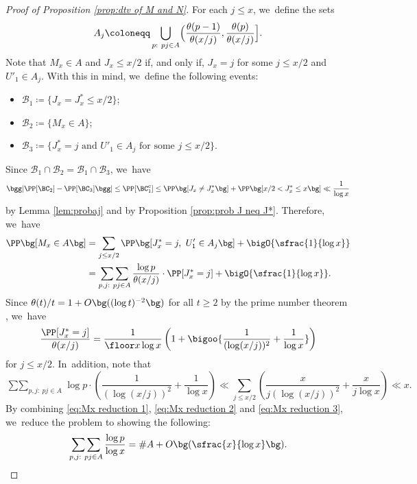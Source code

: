 \begin{proof}[Proof of Proposition \ref{prop:dtv of M and N}]
For each $j \le x$, we~define the sets
\[
A_j \coloneqq \bigcup_{\substack{p:\ pj \in A}} \Bigl(\frac{\theta(p-1)}{\theta(x/j)}, \frac{\theta(p)}{\theta(x/j)}\Bigr].
\]
Note that $M_x \in A$ and $J_x \le x/2$ if, and only if, $J_x=j$ for some $j\le x/2$ and $U'_1 \in A_j$. With this in mind, we~define the following events:
\begin{itemize}
\item $\mathcal B_1 \coloneqq \{J_x=J_x^* \le x/2\}$;
\item $\mathcal B_2 \coloneqq \{ M_x \in A\}$;
\item $\mathcal B_3 \coloneqq \{\mbox{$J_x^* = j$ and $U'_1 \in A_j$ for some $j\le x/2$}\}$.
\end{itemize}
Since $\mathcal B_1 \cap \mathcal B_2 = \mathcal B_1 \cap \mathcal B_3$, we~have
\[
\bgg|\PP[\BC_2] - \PP[\BC_3]\bgg| \le \PP[\BC_1^c] \le \PP\bg[J_x \ne J_x^*\bg] + \PP\bg[x/2< J_x^* \le x\bg] \ll \frac{1}{\log x}
\]
by Lemma \ref{lem:probaj} and by Proposition \ref{prop:prob J neq J*}. Therefore, we~have
\begin{equation}
\label{eq:Mx reduction 1}
\begin{aligned}
\PP\bg[M_x \in A\bg]
&= \sum_{j \le x/2} \PP\bg[J_x^* = j,\ U'_1 \in A_j\bg] + \bigO{\sfrac{1}{\log x}} \\
&= \mathop{\sum\sum}_{p,j:\ pj \in A} \frac{\log p}{\theta(x/j)}\cdot \PP[J_x^* = j] + \bigO{\sfrac{1}{\log x}}.
\end{aligned}
\end{equation}
Since $\theta(t)/t = 1 + O\bg((\log t)^{-2}\bg)$ for all $t \ge 2$ by the prime number theorem \cite[Th.\,8.1]{Koukoulo19}, we~have
\begin{equation}
\label{eq:Mx reduction 2}
\frac{\PP[J_x^* = j]}{\theta(x/j)} = \frac{1}{\floor x \log x}\left(1+\bigoo{\frac{1}{(\log(x/j))^2}+\frac{1}{\log x}}\right)
\end{equation}
for $j\le x/2$. In~addition, note that
\begin{equation}
\label{eq:Mx reduction 3}
\mathop{\sum\sum}_{p,j:\ pj \in A} \log p \cdot \left(\frac{1}{(\log(x/j))^2} + \frac{1}{\log x}\right) \ll \sum_{j \le x/2} \left(\frac{x}{j(\log(x/j))^2} + \frac{x}{j\log x}\right) \ll x.
\end{equation}
By combining \eqref{eq:Mx reduction 1}, \eqref{eq:Mx reduction 2} and \eqref{eq:Mx reduction 3}, we~reduce the problem to showing the following:
\begin{equation}
\label{eq:Mx reduction 4}
\mathop{\sum\sum}_{p,j:\ pj \in A} \frac{\log p}{\log x} = \# A + O\bg(\sfrac{x}{\log x}\bg).

\end{equation}
\end{proof}
